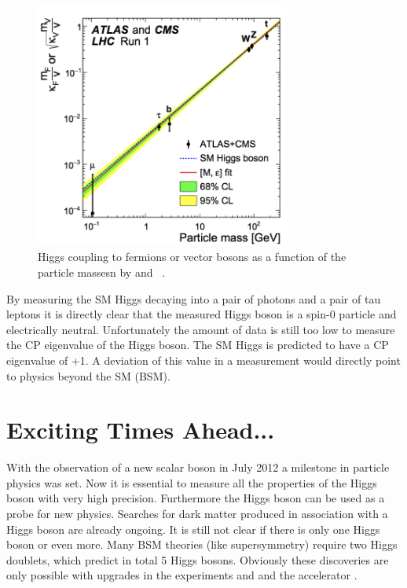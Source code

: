 \begin{figure}[h]
\includegraphics[width=0.75\textwidth]{../plots/higgscoupling_masses}
\caption[Higgs boson coupling.]{Higgs coupling to fermions or vector bosons as a function of the particle massesn by \ATLAS and \CMS~\cite{HiggsMass}.}
\label{figure_higgs_coupling}
\end{figure}

By measuring the SM Higgs decaying into a pair of photons and a pair of tau leptons it is directly clear that the measured Higgs boson is a spin-0 particle and
electrically neutral. Unfortunately the amount of data is still too low to measure the CP eigenvalue of the Higgs boson. The SM Higgs is predicted to have a
CP eigenvalue of +1. A deviation of this value in a measurement would directly point to physics beyond the SM (BSM).

\section{Exciting Times Ahead...}

With the observation of a new scalar boson in July 2012 a milestone in particle physics was set. Now it is essential to measure all the properties
of the Higgs boson with very high precision. Furthermore the Higgs boson can be used as a probe for new physics. Searches for dark matter produced in
association with a Higgs boson are already ongoing. It is still not clear if there is only one Higgs boson or even more. Many BSM theories (like supersymmetry) require two Higgs doublets, which
predict in total 5 Higgs bosons. Obviously these discoveries are only possible with upgrades in the experiments \CMS and \ATLAS and the accelerator \LHC.

